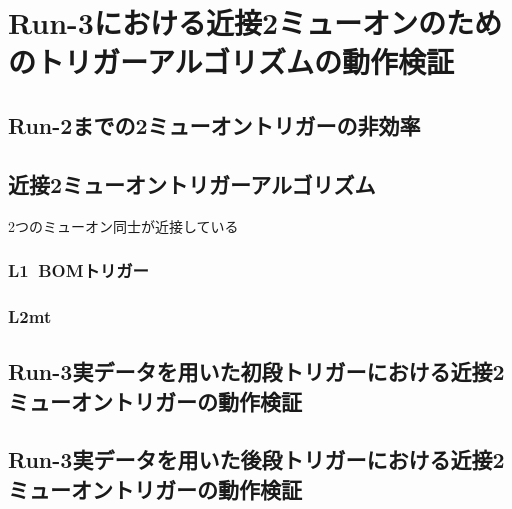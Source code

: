 \chapter{Run-3における近接2ミューオンのためのトリガーアルゴリズムの動作検証}\label{chapter4}

\section{Run-2までの2ミューオントリガーの非効率}\label{4-1}

\section{近接2ミューオントリガーアルゴリズム}\label{4-2}
2つのミューオン同士が近接している

\subsection{L1~BOMトリガー}
\subsection{L2mt}

\section{Run-3実データを用いた初段トリガーにおける近接2ミューオントリガーの動作検証}\label{4-3}

\section{Run-3実データを用いた後段トリガーにおける近接2ミューオントリガーの動作検証}\label{4-4}
